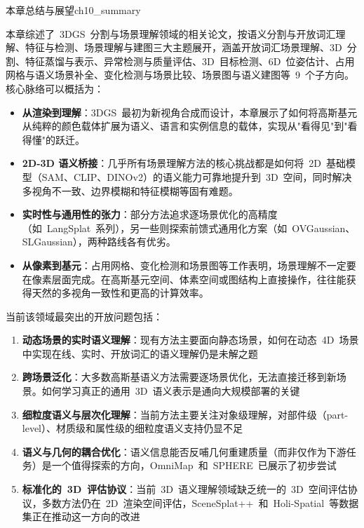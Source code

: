 \begin{futurebox}{本章总结与展望}{ch10_summary}

本章综述了~3DGS~分割与场景理解领域的相关论文，按语义分割与开放词汇理解、特征与检测、场景理解与建图三大主题展开，涵盖开放词汇场景理解、3D~分割、特征蒸馏与表示、异常检测与质量评估、3D~目标检测、6D~位姿估计、占用网格与语义场景补全、变化检测与场景比较、场景图与语义建图等~9~个子方向。核心脉络可以概括为：

\begin{itemize}
\item \textbf{从渲染到理解}：3DGS~最初为新视角合成而设计，本章展示了如何将高斯基元从纯粹的颜色载体扩展为语义、语言和实例信息的载体，实现从"看得见"到"看得懂"的跃迁。
\item \textbf{2D-3D 语义桥接}：几乎所有场景理解方法的核心挑战都是如何将~2D~基础模型（SAM、CLIP、DINOv2）的语义能力可靠地提升到~3D~空间，同时解决多视角不一致、边界模糊和特征模糊等固有难题。
\item \textbf{实时性与通用性的张力}：部分方法追求逐场景优化的高精度（如~LangSplat~系列），另一些则探索前馈式通用化方案（如~OVGaussian、SLGaussian），两种路线各有优劣。
\item \textbf{从像素到基元}：占用网格、变化检测和场景图等工作表明，场景理解不一定要在像素层面完成。在高斯基元空间、体素空间或图结构上直接操作，往往能获得天然的多视角一致性和更高的计算效率。
\end{itemize}

当前该领域最突出的开放问题包括：

\begin{enumerate}
\item \textbf{动态场景的实时语义理解}：现有方法主要面向静态场景，如何在动态~4D~场景中实现在线、实时、开放词汇的语义理解仍是未解之题
\item \textbf{跨场景泛化}：大多数高斯基语义方法需要逐场景优化，无法直接迁移到新场景。如何学习真正的通用~3D~语义表示是通向大规模部署的关键
\item \textbf{细粒度语义与层次化理解}：当前方法主要关注对象级理解，对部件级（part-level）、材质级和属性级的细粒度语义支持仍显不足
\item \textbf{语义与几何的耦合优化}：语义信息能否反哺几何重建质量（而非仅作为下游任务）是一个值得探索的方向，OmniMap~和~SPHERE~已展示了初步尝试
\item \textbf{标准化的~3D~评估协议}：当前~3D~语义理解领域缺乏统一的~3D~空间评估协议，多数方法仍在~2D~渲染空间评估，SceneSplat++~和~Holi-Spatial~等数据集正在推动这一方向的改进
\end{enumerate}

\end{futurebox}
